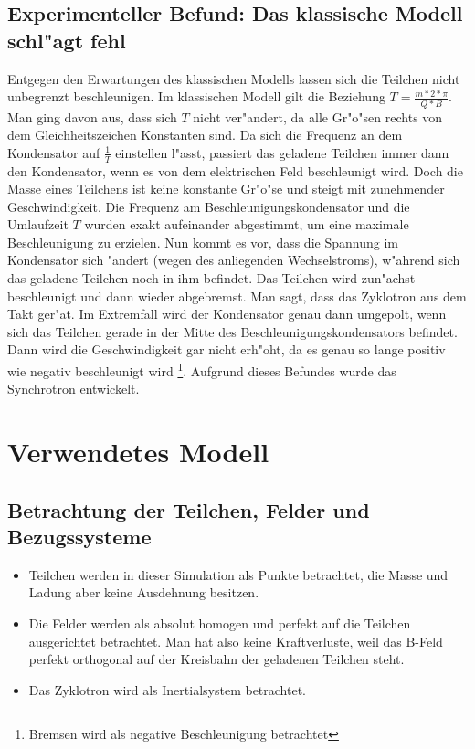 \documentclass[14pt, a4paper]{report}
\begin{document}
\section{Experimenteller Befund: Das klassische Modell schl"agt fehl}
Entgegen den Erwartungen des klassischen Modells
lassen sich die Teilchen nicht unbegrenzt beschleunigen. Im klassischen Modell
gilt die Beziehung $T = \frac{m * 2 * \pi }{Q * B}$.
Man ging davon aus, dass sich $T$ nicht ver"andert, da alle Gr"o"sen rechts von dem 
Gleichheitszeichen Konstanten sind. Da sich die Frequenz an dem Kondensator auf
$\frac{1}{T}$ einstellen l"asst, passiert das geladene Teilchen immer dann den Kondensator,
wenn es von dem elektrischen Feld beschleunigt wird. Doch die Masse eines Teilchens
ist keine konstante Gr"o"se  und steigt mit zunehmender 
Geschwindigkeit. Die Frequenz am Beschleunigungskondensator und die Umlaufzeit $T$ 
wurden
exakt aufeinander abgestimmt, um eine maximale Beschleunigung zu erzielen.
Nun kommt es vor, dass die Spannung im Kondensator sich "andert (wegen des anliegenden Wechselstroms), 
w"ahrend sich das 
geladene Teilchen noch in ihm befindet. Das Teilchen wird zun"achst beschleunigt und
dann wieder abgebremst. Man sagt, dass das Zyklotron aus dem Takt ger"at.
Im Extremfall wird der Kondensator genau dann umgepolt, wenn sich das 
Teilchen gerade in der Mitte des Beschleunigungskondensators befindet. Dann wird die 
Geschwindigkeit gar nicht erh"oht, da es genau so lange positiv wie negativ beschleunigt 
wird \footnote{Bremsen wird als negative Beschleunigung betrachtet}.
Aufgrund dieses Befundes wurde das Synchrotron entwickelt.

\chapter{Verwendetes Modell}
\section{Betrachtung der Teilchen, Felder und Bezugssysteme}
\begin{itemize}
\item Teilchen werden in dieser Simulation als Punkte betrachtet, die Masse und Ladung aber keine 
Ausdehnung besitzen.
\item Die Felder werden als absolut homogen und perfekt auf die Teilchen ausgerichtet
betrachtet. Man hat also keine Kraftverluste, weil das B-Feld perfekt
orthogonal auf der Kreisbahn der geladenen Teilchen steht.
\item Das Zyklotron wird als Inertialsystem betrachtet.
\end{itemize}
\end{document}
